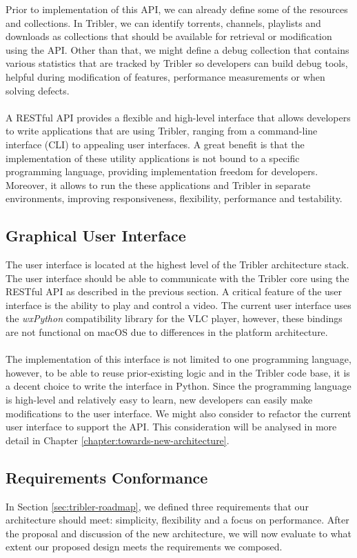 \noindent Prior to implementation of this API, we can already define some of the resources and collections. In Tribler, we can identify torrents, channels, playlists and downloads as collections that should be available for retrieval or modification using the API. Other than that, we might define a debug collection that contains various statistics that are tracked by Tribler so developers can build debug tools, helpful during modification of features, performance measurements or when solving defects.\\\\
A RESTful API provides a flexible and high-level interface that allows developers to write applications that are using Tribler, ranging from a command-line interface (CLI) to appealing user interfaces. A great benefit is that the implementation of these utility applications is not bound to a specific programming language, providing implementation freedom for developers. Moreover, it allows to run the these applications and Tribler in separate environments, improving responsiveness, flexibility, performance and testability.

\subsection{Graphical User Interface}
The user interface is located at the highest level of the Tribler architecture stack. The user interface should be able to communicate with the Tribler core using the RESTful API as described in the previous section. A critical feature of the user interface is the ability to play and control a video. The current user interface uses the \emph{wxPython} compatibility library for the VLC player, however, these bindings are not functional on macOS due to differences in the platform architecture.\\\\
The implementation of this interface is not limited to one programming language, however, to be able to reuse prior-existing logic and in the Tribler code base, it is a decent choice to write the interface in Python. Since the programming language is high-level and relatively easy to learn, new developers can easily make modifications to the user interface. We might also consider to refactor the current user interface to support the API. This consideration will be analysed in more detail in Chapter \ref{chapter:towards-new-architecture}. 

\subsection{Requirements Conformance}
In Section \ref{sec:tribler-roadmap}, we defined three requirements that our architecture should meet: simplicity, flexibility and a focus on performance. After the proposal and discussion of the new architecture, we will now evaluate to what extent our proposed design meets the requirements we composed.

